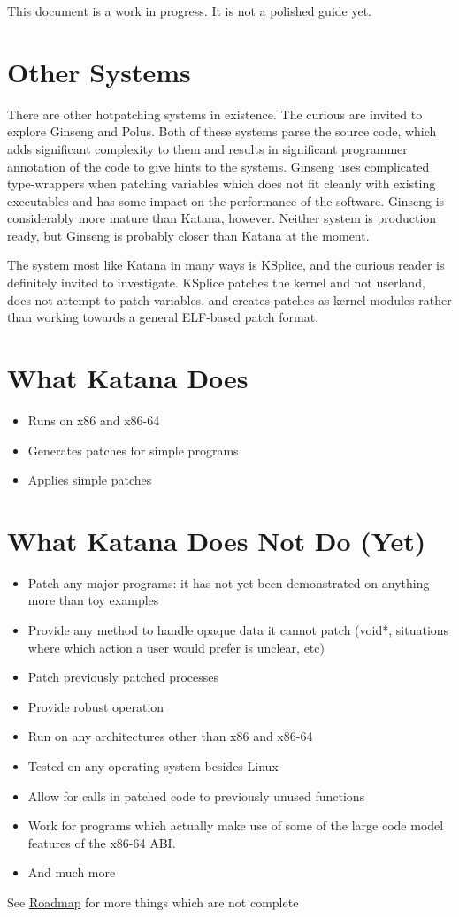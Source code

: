 \documentclass[11pt]{article}
\begin{document}
  This document is a work in progress. It is not a polished guide yet.
\section{Other Systems}
\label{sec-2}

  There are other hotpatching systems in existence. The curious are
  invited to explore Ginseng and Polus. Both of these systems parse
  the source code, which adds significant complexity to them and
  results in significant programmer annotation of the code to give
  hints to the systems. Ginseng uses complicated type-wrappers
  when patching variables which does not fit cleanly with existing
  executables and has some impact on the performance of the
  software. Ginseng is considerably more mature than Katana,
  however. Neither system is production ready, but Ginseng is probably
  closer than Katana at the moment.

  The system most like Katana in many ways is KSplice, and the curious
  reader is definitely invited to investigate. KSplice patches the
  kernel and not userland, does not attempt to patch variables, and
  creates patches as kernel modules rather than working towards a
  general ELF-based patch format.
\section{What Katana Does}
\label{sec-3}

\begin{itemize}
\item Runs on x86 and x86-64
\item Generates patches for simple programs
\item Applies simple patches
\end{itemize}
\section{What Katana Does Not Do (Yet)}
\label{sec-4}

\begin{itemize}
\item Patch any major programs: it has not yet been demonstrated on
    anything more than toy examples
\item Provide any method to handle opaque data it cannot patch (void*,
    situations where which action a user would prefer is unclear, etc)
\item Patch previously patched processes
\item Provide robust operation
\item Run on any architectures other than x86 and x86-64
\item Tested on any operating system besides Linux
\item Allow for calls in patched code to previously unused functions
\item Work for programs which actually make use of some of the large
    code model features of the x86-64 ABI.
\item And much more
\end{itemize}
  See \hyperref[sec-10]{Roadmap} for more things which are not complete
\end{document}
